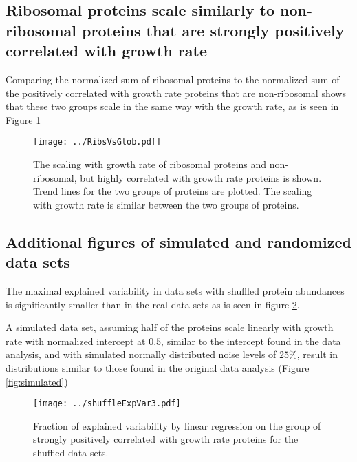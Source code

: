 \documentclass{article}
\begin{document}
\subsection{Ribosomal proteins scale similarly to non-ribosomal proteins that are strongly positively correlated with growth rate}
Comparing the normalized sum of ribosomal proteins to the normalized sum of the positively correlated with growth rate proteins that are non-ribosomal shows that these two groups scale in the same way with the growth rate, as is seen in Figure \ref{fig:ribsnonribs}


\begin{figure}[H]
\begin{center}
\texttt{[image: ../RibsVsGlob.pdf]}
\caption{\label{fig:ribsnonribs}
  The scaling with growth rate of ribosomal proteins and non-ribosomal, but highly correlated with growth rate proteins is shown.
Trend lines for the two groups of proteins are plotted.
The scaling with growth rate is similar between the two groups of proteins.
%
}
\end{center}
\end{figure}

\subsection{Additional figures of simulated and randomized data sets}
The maximal explained variability in data sets with shuffled protein abundances is significantly smaller than in the real data sets as is seen in figure \ref{fig:shuffledexpvar}.

A simulated data set, assuming half of the proteins scale linearly with growth rate with normalized intercept at $0.5$, similar to the intercept found in the data analysis, and with simulated normally distributed noise levels of $25\%$, result in distributions similar to those found in the original data analysis (Figure \ref{fig:simulated})

\begin{figure}[H]
\begin{center}
\texttt{[image: ../shuffleExpVar3.pdf]}
\caption{\label{fig:shuffledexpvar}
Fraction of explained variability by linear regression on the group of strongly positively correlated with growth rate proteins for the shuffled data sets.
%
}
\end{center}
\end{figure}
\end{document}
